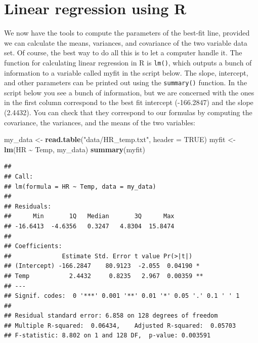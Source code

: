 \documentclass[
]{book}
\newenvironment{Shaded}{\begin{snugshade}}{\end{snugshade}}
\newcommand{\DataTypeTok}[1]{\textcolor[rgb]{0.13,0.29,0.53}{#1}}
\newcommand{\KeywordTok}[1]{\textcolor[rgb]{0.13,0.29,0.53}{\textbf{#1}}}
\newcommand{\NormalTok}[1]{#1}
\newcommand{\OperatorTok}[1]{\textcolor[rgb]{0.81,0.36,0.00}{\textbf{#1}}}
\newcommand{\OtherTok}[1]{\textcolor[rgb]{0.56,0.35,0.01}{#1}}
\newcommand{\StringTok}[1]{\textcolor[rgb]{0.31,0.60,0.02}{#1}}
\theoremstyle{definition}
\theoremstyle{definition}
\theoremstyle{definition}
\theoremstyle{remark}
\begin{document}
\hypertarget{linear-regression-using-r}{%
\section{Linear regression using R}\label{linear-regression-using-r}}

\label{sec:comp6}

We now have the tools to compute the parameters of the best-fit line, provided we can calculate the means, variances, and covariance of the two variable data set. Of course, the best way to do all this is to let a computer handle it. The function for calculating linear regression in R is \texttt{lm()}, which outputs a bunch of information to a variable called myfit in the script below. The slope, intercept, and other parameters can be printed out using the \texttt{summary()} function. In the script below you see a bunch of information, but we are concerned with the ones in the first column correspond to the best fit intercept (-166.2847) and the slope (2.4432). You can check that they correspond to our formulas by computing the covariance, the variances, and the means of the two variables:

\begin{Shaded}
\begin{Highlighting}[]
\NormalTok{my\_data \textless{}{-}}\StringTok{ }\KeywordTok{read.table}\NormalTok{(}\StringTok{"data/HR\_temp.txt"}\NormalTok{, }\DataTypeTok{header =} \OtherTok{TRUE}\NormalTok{)}
\NormalTok{myfit \textless{}{-}}\StringTok{ }\KeywordTok{lm}\NormalTok{(HR }\OperatorTok{\textasciitilde{}}\StringTok{ }\NormalTok{Temp, my\_data)}
\KeywordTok{summary}\NormalTok{(myfit)}
\end{Highlighting}
\end{Shaded}

\begin{verbatim}
## 
## Call:
## lm(formula = HR ~ Temp, data = my_data)
## 
## Residuals:
##      Min       1Q   Median       3Q      Max 
## -16.6413  -4.6356   0.3247   4.8304  15.8474 
## 
## Coefficients:
##              Estimate Std. Error t value Pr(>|t|)   
## (Intercept) -166.2847    80.9123  -2.055  0.04190 * 
## Temp           2.4432     0.8235   2.967  0.00359 **
## ---
## Signif. codes:  0 '***' 0.001 '**' 0.01 '*' 0.05 '.' 0.1 ' ' 1
## 
## Residual standard error: 6.858 on 128 degrees of freedom
## Multiple R-squared:  0.06434,    Adjusted R-squared:  0.05703 
## F-statistic: 8.802 on 1 and 128 DF,  p-value: 0.003591
\end{verbatim}
\end{document}
